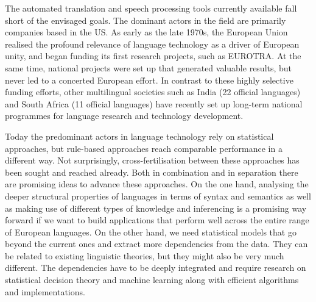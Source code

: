 \documentclass[10pt, plain]{../../metanetpaper}
\begin{document}
\begin{multicols}{2}
The automated translation and speech processing tools currently available fall short of the envisaged goals. The dominant actors in the field are primarily companies based in the US. As early as the late 1970s, the European Union realised the profound relevance of language technology as a driver of European unity, and began funding its first research projects, such as EUROTRA. At the same time, national projects were set up that generated valuable results, but never led to a concerted European effort. In contrast to these highly selective funding efforts, other multilingual societies such as India (22 official languages) and South Africa (11 official languages) have recently set up long-term national programmes for language research and technology development.

Today the predominant actors in language technology rely on statistical approaches, but rule-based approaches reach comparable performance in a different way. Not surprisingly, cross-fertilisation between these approaches has been sought and reached already. Both in combination and in separation there are promising ideas to advance these approaches. On the one hand, analysing the deeper structural properties of languages in terms of syntax and semantics as well as making use of different types of knowledge and inferencing is a promising way forward if we want to build applications that perform well across the entire range of European languages. On the other hand, we need statistical models that go beyond the current ones and extract more dependencies from the data. They can be related to existing linguistic theories, but they might also be very much different. The dependencies have to be deeply integrated and require research on statistical decision theory and machine learning along with efficient algorithms and implementations.

%


\end{multicols}
\end{document}
